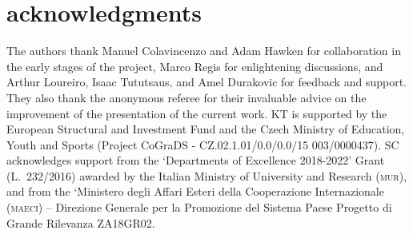 \documentclass[astrosymb,twocolumn]{aastex631}
\newcommand{\stefc}[1]{\textcolor{red}{\textsf{[\textbf{Stef:} #1]}}}
\begin{document}
\section*{acknowledgments}

The authors thank Manuel Colavincenzo and Adam Hawken for collaboration in the early stages of the project, Marco Regis for enlightening discussions, and Arthur Loureiro, Isaac Tututsaus, and Amel Durakovic for feedback and support. They also thank the anonymous referee for their invaluable advice on the improvement of the presentation of the current work. KT is supported by the
European Structural and Investment Fund and the
Czech Ministry of Education, Youth and Sports (Project
CoGraDS - CZ.02.1.01/0.0/0.0/15 003/0000437). SC acknowledges support from the `Departments of Excellence 2018-2022' Grant (L.\ 232/2016) awarded by the Italian Ministry of University and Research (\textsc{mur}), and from the `Ministero degli Affari Esteri della Cooperazione Internazionale (\textsc{maeci}) -- Direzione Generale per la Promozione del Sistema Paese Progetto di Grande Rilevanza ZA18GR02.


{}




\end{document}
